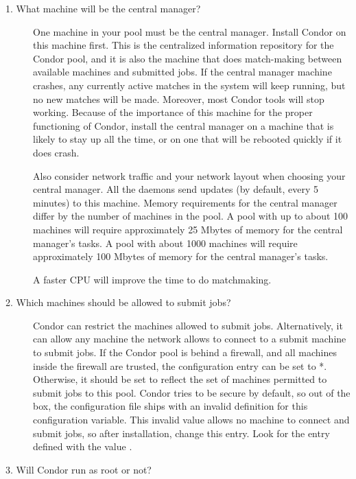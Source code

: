 \begin{description}

\item[1. What machine will be the central manager?]

One machine in your pool must be the central manager.
Install Condor on this machine first.
This is the centralized information repository for the Condor pool,
and it is also the
machine that does match-making between available machines and
submitted jobs.
If the central manager machine crashes, any currently active
matches in the system will keep running, but no new matches will be
made.  Moreover, most Condor tools will stop working.  Because of the
importance of this machine for the proper functioning of Condor,
install the central manager on a machine that is likely to stay up all the
time, or on one that will be rebooted quickly if it does crash.

Also consider
network traffic and your network layout when choosing your central
manager.
All the daemons send updates (by default, every 5 minutes) to this machine.
Memory requirements for the central manager differ by the number of machines
in the pool.
A pool with up to about 100 machines will require approximately
25 Mbytes of memory for the central manager's tasks.
A pool with about 1000 machines will require approximately
100 Mbytes of memory for the central manager's tasks.

A faster CPU will improve the time to do matchmaking. 

\item[2. Which machines should be allowed to submit jobs?]

Condor can restrict the machines allowed to submit jobs.  Alternatively, 
it can allow any machine the network allows to connect to a submit machine
to submit jobs.  If the Condor pool is behind a firewall, and all machines
inside the firewall are trusted, the  configuration
entry can be set to *.  Otherwise, it should be set to reflect
the set of machines permitted to submit jobs to this pool.
Condor tries to be secure by default,
so out of the box, the configuration file ships with an invalid definition
for this configuration variable.
This invalid value allows no machine to connect and submit
jobs, so after installation, change this entry.
Look for the
entry defined with the value
.

\item[3. Will Condor run as root or not?]


\end{description}
